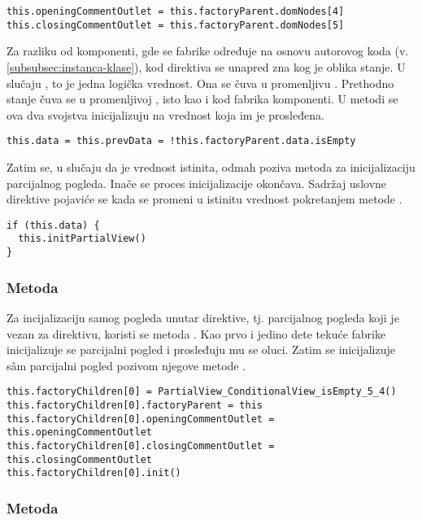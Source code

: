 \begin{lstlisting}
this.openingCommentOutlet = this.factoryParent.domNodes[4]
this.closingCommentOutlet = this.factoryParent.domNodes[5]
\end{lstlisting}

Za razliku od komponenti, gde se  fabrike određuje na osnovu autorovog koda (v. \cref{subsubsec:instanca-klase}), kod direktiva se unapred zna kog je oblika stanje.
U slučaju , to je jedna logička vrednost.
Ona se čuva u promenljivu .
Prethodno stanje čuva se u promenljivoj , isto kao i kod fabrika komponenti.
U metodi  se ova dva svojstva inicijalizuju na vrednost koja im je prosleđena.

\begin{lstlisting}
this.data = this.prevData = !this.factoryParent.data.isEmpty
\end{lstlisting}

Zatim se, u slučaju da je vrednost  istinita, odmah poziva metoda za inicijalizaciju parcijalnog pogleda.
Inače se proces inicijalizacije okončava.
Sadržaj uslovne direktive pojaviće se kada se  promeni u istinitu vrednost pokretanjem metode .

\begin{lstlisting}
if (this.data) {
  this.initPartialView()
}
\end{lstlisting}

\subsubsection{Metoda }

Za incijalizaciju samog pogleda unutar direktive, tj. parcijalnog pogleda koji je vezan za direktivu, koristi se metoda .
Kao prvo i jedino dete tekuće fabrike inicijalizuje se parcijalni pogled i prosleđuju mu se oluci.
Zatim se inicijalizuje sâm parcijalni pogled pozivom njegove metode .

\begin{lstlisting}
this.factoryChildren[0] = PartialView_ConditionalView_isEmpty_5_4()
this.factoryChildren[0].factoryParent = this
this.factoryChildren[0].openingCommentOutlet = this.openingCommentOutlet
this.factoryChildren[0].closingCommentOutlet = this.closingCommentOutlet
this.factoryChildren[0].init()
\end{lstlisting}

\subsubsection{Metoda }

